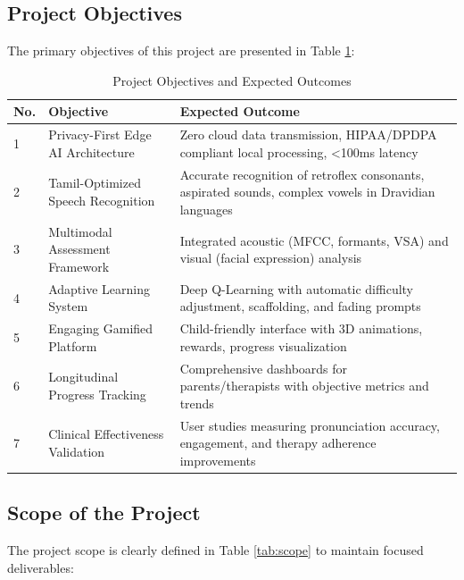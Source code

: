 \documentclass[12pt,a4paper]{article}
\begin{document}
\subsection{Project Objectives}

The primary objectives of this project are presented in Table \ref{tab:objectives}:

\begin{table}[H]
\centering
\caption{Project Objectives and Expected Outcomes}
\label{tab:objectives}
\small
\begin{tabular}{p{1cm}p{5.5cm}p{7cm}}
\toprule
\textbf{No.} & \textbf{Objective} & \textbf{Expected Outcome} \\
\midrule
1 & Privacy-First Edge AI Architecture & Zero cloud data transmission, HIPAA/DPDPA compliant local processing, <100ms latency \\
\hline
2 & Tamil-Optimized Speech Recognition & Accurate recognition of retroflex consonants, aspirated sounds, complex vowels in Dravidian languages \\
\hline
3 & Multimodal Assessment Framework & Integrated acoustic (MFCC, formants, VSA) and visual (facial expression) analysis \\
\hline
4 & Adaptive Learning System & Deep Q-Learning with automatic difficulty adjustment, scaffolding, and fading prompts \\
\hline
5 & Engaging Gamified Platform & Child-friendly interface with 3D animations, rewards, progress visualization \\
\hline
6 & Longitudinal Progress Tracking & Comprehensive dashboards for parents/therapists with objective metrics and trends \\
\hline
7 & Clinical Effectiveness Validation & User studies measuring pronunciation accuracy, engagement, and therapy adherence improvements \\
\bottomrule
\end{tabular}
\end{table}

\subsection{Scope of the Project}

The project scope is clearly defined in Table \ref{tab:scope} to maintain focused deliverables:
\end{document}
